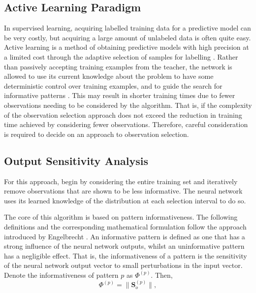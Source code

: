 \documentclass[10pt, conference]{IEEEtran}
\begin{document}
\subsection{Active Learning Paradigm}
In supervised learning, acquiring labelled training data for a predictive model can be very costly, but acquiring a large amount of unlabeled data is often quite easy. Active learning is a method of obtaining predictive models with high precision at a limited cost through the adaptive selection of samples for labelling \cite{Hino2020ActiveLP}. Rather than passively accepting training examples from the teacher, the network is allowed to use its current knowledge about the problem to have some deterministic control over training examples, and to guide the search for informative patterns \cite{sasla}. This may result in shorter training times due to fewer observations needing to be considered by the algorithm. That is, if the complexity of the observation selection approach does not exceed the reduction in training time achieved by considering fewer observations. Therefore, careful consideration is required to decide on an approach to observation selection.



\subsection{Output Sensitivity Analysis}
For this approach, begin by considering the entire training set and iteratively remove observations that are shown to be less informative. The neural network uses its learned knowledge of the distribution at each selection interval to do so.


The core of this algorithm is based on pattern informativeness. The following definitions and the corresponding mathematical formulation follow the approach introduced by Engelbrecht \cite{sasla}. An informative pattern is defined as one that has a strong influence of the neural network outputs, whilst an uninformative pattern has a negligible effect. That is, the informativeness of a pattern is the sensitivity of the neural network output vector to small perturbations in the input vector. Denote the informativeness of pattern $p$ as $\Phi^{(p)}$. Then,
\begin{equation}
	\Phi^{(p)} = \lVert \mathbf{S}_o^{(p)}	 \rVert,
	\label{eq:inform}
\end{equation}
\end{document}
